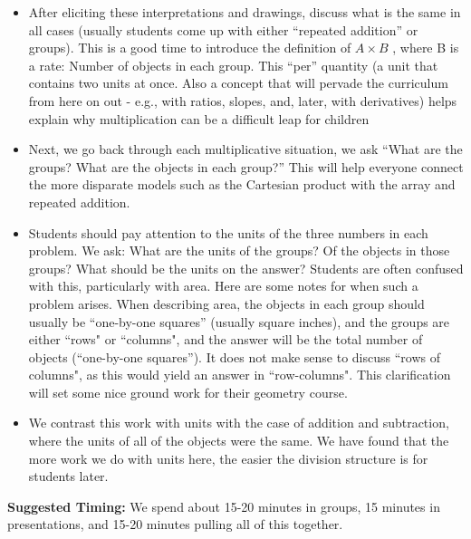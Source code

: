 \documentclass{ximera}
\begin{document}
\begin{instructorNotes}
\begin{itemize}
	\item After eliciting these interpretations and drawings, discuss what is the same in all cases (usually students come up with either ``repeated addition'' or groups).  This is a good time to introduce the definition of $A\times B$ , where B is a rate:  Number of objects in each group.  This ``per'' quantity (a unit that contains two units at once.  Also a concept that will pervade the curriculum from here on out - e.g., with ratios, slopes, and, later, with derivatives) helps explain why multiplication can be a difficult leap for children
	\item Next, we go back through each multiplicative situation, we ask ``What are the groups? What are the objects in each group?''  This will help everyone connect the more disparate models such as the Cartesian product with the array and repeated addition. 
	\item Students should pay attention to the units of the three numbers in each problem. We ask: What are the units of the groups?  Of the objects in those groups?  What should be the units on the answer?  Students are often confused with this, particularly with area. Here are some notes for when such a problem arises.  When describing area, the objects in each group should usually be ``one-by-one squares'' (usually square inches), and the groups are either ``rows" or ``columns", and the answer will be the total number of objects (``one-by-one squares''). It does not make sense to discuss ``rows of columns", as this would yield an answer in ``row-columns". This clarification will set some nice ground work for their geometry course.
	\item We contrast this work with units with the case of addition and subtraction, where the units of all of the objects were the same.  We have found that the more work we do with units here, the easier the division structure is for students later.
\end{itemize}




{\bf Suggested Timing:} We spend about 15-20 minutes in groups, 15 minutes in presentations, and 15-20 minutes pulling all of this together.
\end{instructorNotes}
\end{document}
